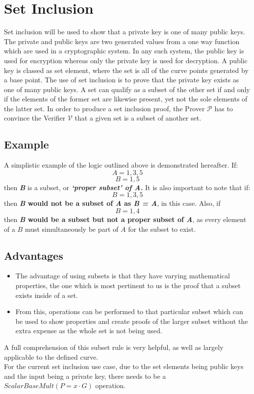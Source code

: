 \documentclass{article}
\begin{document}
\section{Set Inclusion}
Set inclusion will be used to show that a private key is one of many public keys. The private and public keys are two generated values from a one way function which are used in a cryptographic system. In any such system, the public key is used for encryption whereas only the private key is used for decryption. A public key is classed as set element, where the set is all of the curve points generated by a base point. The use of set inclusion is to prove that the private key exists as one of many public keys. A set can qualify as a subset of the other set if and only if the elements of the former set are likewise present, yet not the sole elements of the latter set. In order to produce a set inclusion proof, the Prover $\mathcal{P}$ has to convince the Verifier $\mathcal{V}$ that a given set is a subset of another set.
\subsection{Example}
A simplistic example of the logic outlined above is demonstrated hereafter. If:  $$ A={1,3,5} $$
$$ B={1,5} $$ then \textbf{\textit{B}} is a subset, or \textbf{\textit{‘proper subset’ of A.}} 
It is also important to note that if: $$ B={1,3,5} $$ then \textbf{\textit{B} would not be a subset of \textit{A} as \textit{B = A}}, in this case. Also, if $$ B={1,4} $$ then \textbf{\textit{B} would be a subset but not a proper subset of \textit{A}}, as every element of a $B$ must simultaneously be part of $A$ for the subset to exist.
\subsection{Advantages}
\begin{itemize}
    \item The advantage of using subsets is that they have varying mathematical properties, the one which is most pertinent to us is the proof that a subset exists inside of a set.
    \item From this, operations can be performed to that particular subset which can be used to show properties and create proofs of the larger subset without the extra expense as the whole set is not being used.
\end{itemize}
A full comprehension of this subset rule is very helpful, as well as largely applicable to the defined curve. \\
For the current set inclusion use case, due to the set elements being public keys and the input being a private key, there needs to be a $ScalarBaseMult (P=x\cdot G)$ operation.
\end{document}

